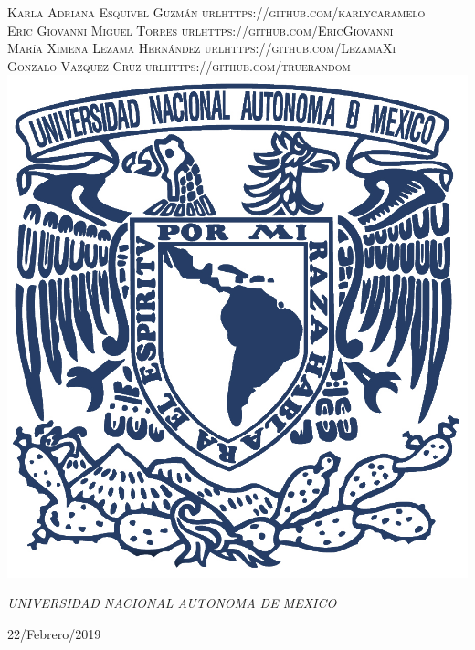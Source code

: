\documentclass[a4paper, 11pt, oneside]{article}
\begin{document}
\begin{titlepage}
	{\scshape\Large Karla Adriana Esquivel Guzmán url{https://github.com/karlycaramelo} \\
    Eric Giovanni Miguel Torres url{https://github.com/EricGiovanni}\\ 
    María Ximena Lezama Hernández url{https://github.com/LezamaXi}\\ 
    Gonzalo Vazquez Cruz url{https://github.com/truerandom}}  
	\vspace{0.5\baselineskip} 
	\vfill
	\includegraphics{unam.jpg}
	
	\textit{UNIVERSIDAD NACIONAL AUTONOMA DE MEXICO} 
	
	
	
	
	
	\vspace{0.3\baselineskip} 
	
	22/Febrero/2019 
	
	 

\end{titlepage}
\end{document}
